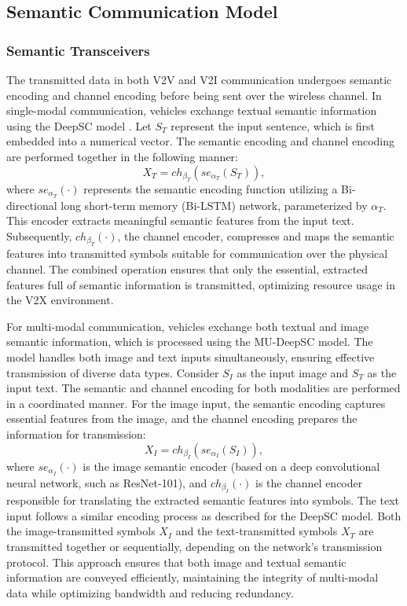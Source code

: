 \documentclass[10pt, lettersize,journal]{IEEEtran}
\begin{document}
	\subsection{Semantic Communication Model}
	\subsubsection{Semantic Transceivers}
	The transmitted data in both V2V and V2I communication undergoes semantic encoding and channel encoding before being sent over the wireless channel.
	In single-modal communication, vehicles exchange textual semantic information using the DeepSC model \cite{9398576}.
	Let ${S_{T}}$ represent the input sentence, which is first embedded into a numerical vector. The semantic encoding and channel encoding are performed together in the following manner:
	\begin{equation}\label{eq1}
		{X_{T}} = c{h_{{\beta _T}}}(s{e_{{\alpha _T}}}({S_{T}})),
	\end{equation}
	where $s{e_{{\alpha _T}}}( \cdot )$ represents the semantic encoding function utilizing a Bi-directional long short-term memory (Bi-LSTM) network, parameterized by ${\alpha _T}$. This encoder extracts meaningful semantic features from the input text. 
	Subsequently, $c{h_{{\beta _T}}}\left(  \cdot  \right)$, the channel encoder, compresses and maps the semantic features into transmitted symbols suitable for communication over the physical channel. The combined operation ensures that only the essential, extracted features full of semantic information is transmitted, optimizing resource usage in the V2X environment.
	
    For multi-modal communication, vehicles exchange both textual and image semantic information, which is processed using the MU-DeepSC model. The model handles both image and text inputs simultaneously, ensuring effective transmission of diverse data types.  Consider ${S_{I}}$ as the input image and ${S_{T}}$ as the input text. The semantic and channel encoding for both modalities are performed in a coordinated manner.
	For the image input, the semantic encoding captures essential features from the image, and the channel encoding prepares the information for transmission: 
	\begin{equation}\label{eq2}
		{X_{I}} = c{h_{{\beta _I}}}(s{e_{{\alpha _I}}}({S_{I}})),
	\end{equation}
	where $s{e_{{\alpha _I}}}( \cdot )$ is the image semantic encoder (based on a deep convolutional neural network, such as ResNet-101), and $c{h_{{\beta _I}}}( \cdot )$ is the channel encoder responsible for translating the extracted semantic features into symbols. The text input follows a similar encoding process as described for the DeepSC model. Both the image-transmitted symbols ${X_{I}}$ and the text-transmitted symbols ${X_{T}}$ are transmitted together or sequentially, depending on the network’s transmission protocol. This approach ensures that both image and textual semantic information are conveyed efficiently, maintaining the integrity of multi-modal data while optimizing bandwidth and reducing redundancy.
\end{document}
